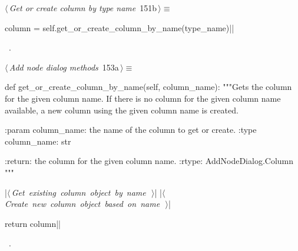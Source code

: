 \documentclass[%
    a4paper,    %
    justified,  %
    nobib,      %
    openany     %
]{tufte-book}
\begin{document}
%
\begin{flushleft} \small
\begin{minipage}{\linewidth}\label{scrap156}\raggedright\small
{} $\langle\,${\itshape Get or create column by type name}\nobreak\ {\footnotesize {151b}}$\,\rangle\equiv$
\vspace{-1ex}
\begin{pythoncode}
    column = self.get_or_create_column_by_name(type_name)|\NWsep|
\end{pythoncode}
\vspace{1.5ex}
\footnotesize
\begin{list}{}{\setlength{\itemsep}{-\parsep}\setlength{\itemindent}{-\leftmargin}}
\item \NWtxtMacroRefIn\ .

\item{}
\end{list}
\end{minipage}\vspace{4ex}
\end{flushleft}
%
\begin{flushleft} \small
\begin{minipage}{\linewidth}\label{scrap157}\raggedright\small
{} $\langle\,${\itshape Add node dialog methods}\nobreak\ {\footnotesize {153a}}$\,\rangle\equiv$
\vspace{-1ex}
\begin{pythoncode}
def get_or_create_column_by_name(self, column_name):
    """Gets the column for the given column name.
    If there is no column for the given column name available, a new column
    using the given column name is created.

    :param column_name: the name of the column to get or create.
    :type  column_name: str

    :return: the column for the given column name.
    :rtype:  AddNodeDialog.Column
    """

    |\hbox{$\langle\,${\itshape Get existing column object by name}\nobreak\ {\footnotesize {}}$\,\rangle$}|
    |\hbox{$\langle\,${\itshape Create new column object based on name}\nobreak\ {\footnotesize {}}$\,\rangle$}|

    return column|\NWsep|
\end{pythoncode}
\vspace{1.5ex}
\footnotesize
\begin{list}{}{\setlength{\itemsep}{-\parsep}\setlength{\itemindent}{-\leftmargin}}
\item \NWtxtMacroRefIn\ .

\item{}
\end{list}
\end{minipage}\vspace{4ex}
\end{flushleft}
\end{document}
